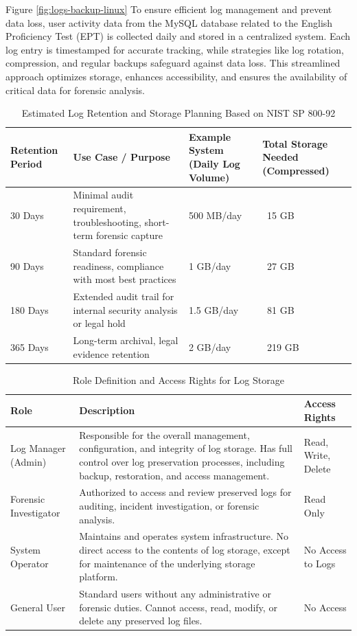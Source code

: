 Figure \ref{fig:logs-backup-linux} To ensure efficient log management and prevent data loss, user activity data from the MySQL database related to the English Proficiency Test (EPT) is collected daily and stored in a centralized system. Each log entry is timestamped for accurate tracking, while strategies like log rotation, compression, and regular backups safeguard against data loss. This streamlined approach optimizes storage, enhances accessibility, and ensures the availability of critical data for forensic analysis.

\begin{table}[H]
	\centering
	\caption{Estimated Log Retention and Storage Planning Based on NIST SP 800-92}
	\begin{tabular}{|p{3cm}|p{4.5cm}|p{4cm}|p{3cm}|}
		\hline
		\textbf{Retention Period} & \textbf{Use Case / Purpose} & \textbf{Example System (Daily Log Volume)} & \textbf{Total Storage Needed (Compressed)} \\
		\hline
		30 Days & Minimal audit requirement, troubleshooting, short-term forensic capture & 500 MB/day & ~15 GB \\
		\hline
		90 Days & Standard forensic readiness, compliance with most best practices & 1 GB/day & ~27 GB \\
		\hline
		180 Days & Extended audit trail for internal security analysis or legal hold & 1.5 GB/day & ~81 GB \\
		\hline
		365 Days & Long-term archival, legal evidence retention & 2 GB/day & ~219 GB \\
		\hline
	\end{tabular}
	\label{tab:log_retention_nist}
\end{table}

\begin{table}[H]
	\centering
	\caption{Role Definition and Access Rights for Log Storage}
	\begin{tabular}{|l|p{7cm}|p{3cm}|}
		\hline
		\textbf{Role} & \textbf{Description} & \textbf{Access Rights} \\ \hline
		Log Manager (Admin) & Responsible for the overall management, configuration, and integrity of log storage. Has full control over log preservation processes, including backup, restoration, and access management. & Read, Write, Delete \\ \hline
		Forensic Investigator & Authorized to access and review preserved logs for auditing, incident investigation, or forensic analysis. & Read Only \\ \hline
		System Operator & Maintains and operates system infrastructure. No direct access to the contents of log storage, except for maintenance of the underlying storage platform. & No Access to Logs \\ \hline
		General User & Standard users without any administrative or forensic duties. Cannot access, read, modify, or delete any preserved log files. & No Access \\ \hline
	\end{tabular}
	\label{tab:role_access_log_storage}
\end{table}

